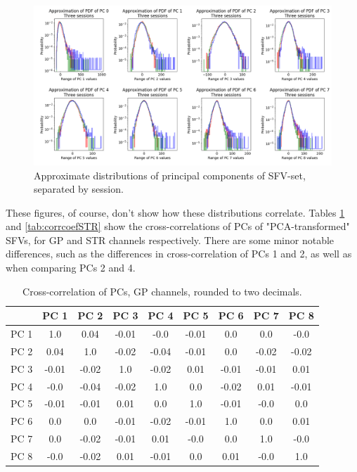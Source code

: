 \documentclass{kththesis}
\begin{document}
\begin{figure}[H]
    \centering
    \centerline{\includegraphics[width=1.2\textwidth]{images/PCA/PCAAnimalslg2.png}}
    \caption{Approximate distributions of principal components of SFV-set, separated by session.}
    \label{fig:PCAAnimalslg2}
\end{figure}

These figures, of course, don't show how these distributions correlate.
Tables \ref{tab:corrcoefGP} and \ref{tab:corrcoefSTR} show the cross-correlations of PCs of "PCA-transformed" SFVs, for GP and STR channels respectively.
There are some minor notable differences, such as the differences in cross-correlation of PCs 1 and 2, as well as when comparing PCs 2 and 4.

\begin{table}[H]
    \centering
    \begin{tabular}{|c|c|c|c|c|c|c|c|c|}
    \hline
          & PC 1  & PC 2  & PC 3  & PC 4  & PC 5  & PC 6  & PC 7  & PC 8    \\ \hline
     PC 1 & 1.0   & 0.04  & -0.01 & -0.0  & -0.01 & 0.0   & 0.0   & -0.0    \\ \hline
     PC 2 & 0.04  & 1.0   & -0.02 & -0.04 & -0.01 & 0.0   & -0.02 & -0.02   \\ \hline
     PC 3 & -0.01 & -0.02 & 1.0   & -0.02 & 0.01  & -0.01 & -0.01 & 0.01    \\ \hline
     PC 4 & -0.0  & -0.04 & -0.02 & 1.0   & 0.0   & -0.02 & 0.01  & -0.01   \\ \hline
     PC 5 & -0.01 & -0.01 & 0.01  & 0.0   & 1.0   & -0.01 & -0.0  & 0.0     \\ \hline
     PC 6 & 0.0   & 0.0   & -0.01 & -0.02 & -0.01 & 1.0   & 0.0   & 0.01    \\ \hline
     PC 7 & 0.0   & -0.02 & -0.01 & 0.01  & -0.0  & 0.0   & 1.0   & -0.0    \\ \hline
     PC 8 & -0.0  & -0.02 & 0.01  & -0.01 & 0.0   & 0.01  & -0.0  & 1.0     \\ \hline
    \end{tabular}
    \caption{Cross-correlation of PCs, GP channels, rounded to two decimals.}
    \label{tab:corrcoefGP}
\end{table}
\end{document}

